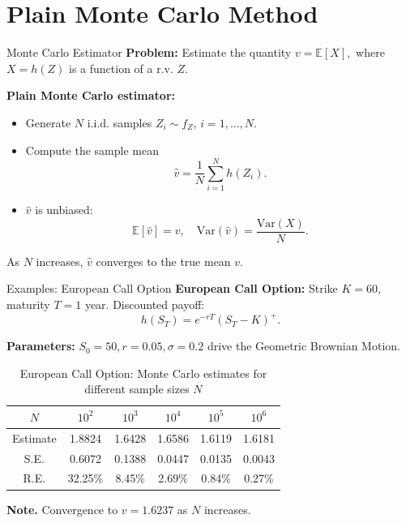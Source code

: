 \documentclass[9pt]{beamer}
\begin{document}
\section[Plain Monte Carlo Method]{Plain Monte Carlo Method}

\begin{frame}{Monte Carlo Estimator}
\small
\textbf{Problem:} Estimate the quantity
\(v = \mathbb{E}[X],\)
where \(X = h(Z)\) is a function of a r.v. \(Z\).

\textbf{Plain Monte Carlo estimator:}
\begin{itemize}
    \item Generate \(N\) i.i.d. samples \(Z_i \sim f_Z\), $i = 1, ..., N$.
    \item Compute the sample mean
    \[
    \hat{v} = \frac{1}{N} \sum_{i=1}^{N} h(Z_i).
    \]
    \item \(\hat{v}\) is unbiased:
    \[
    \mathbb{E}[\hat{v}] = v, \quad \mathrm{Var}(\hat{v}) = \frac{\mathrm{Var}(X)}{N}.
    \]
\end{itemize}

As \(N\) increases, \(\hat{v}\) converges to the true mean \(v\).
\end{frame}

\begin{frame}{Examples: European Call Option}
\small
\textbf{European Call Option:} Strike \(K = 60\), maturity \(T = 1\) year. Discounted payoff:
\[
h(S_T) = e^{-rT} (S_T - K)^+.
\]

\textbf{Parameters:} \(S_0 = 50, r = 0.05, \sigma = 0.2\) drive the Geometric Brownian Motion.

\begin{table}[ht]
\centering
\begin{tabular}{c c c c c c}
\toprule
$N$ & $10^2$ & $10^3$ & $10^4$ & $10^5$ & $10^6$ \\
\midrule
Estimate & 1.8824 & 1.6428 & 1.6586 & 1.6119 & 1.6181 \\
S.E. & 0.6072 & 0.1388 & 0.0447 & 0.0135 & 0.0043 \\
R.E. & 32.25\% & 8.45\% & 2.69\% & 0.84\% & 0.27\% \\
\bottomrule
\end{tabular}
\caption{European Call Option: Monte Carlo estimates for different sample sizes $N$}
\end{table}

\textbf{Note.} Convergence to \(v = 1.6237\)  as \(N\) increases.
\end{frame}
\end{document}
